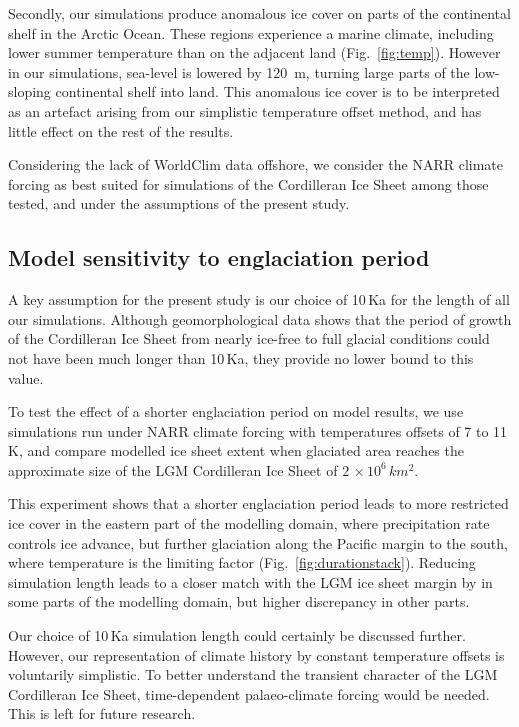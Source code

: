 Secondly, our simulations produce anomalous ice cover on parts of the continental shelf in the Arctic Ocean. These regions experience a marine climate, including lower summer temperature than on the adjacent land (Fig.~\ref{fig:temp}). However in our simulations, sea-level is lowered by 120~m, turning large parts of the low-sloping continental shelf into land. This anomalous ice cover is to be interpreted as an artefact arising from our simplistic temperature offset method, and has little effect on the rest of the results.

Considering the lack of WorldClim data offshore, we consider the NARR climate forcing as best suited for simulations of the Cordilleran Ice Sheet among those tested, and under the assumptions of the present study.

\subsection{Model sensitivity to englaciation period}

A key assumption for the present study is our choice of 10\,Ka for the length of all our simulations. Although geomorphological data shows that the period of growth of the Cordilleran Ice Sheet from nearly ice-free to full glacial conditions could not have been much longer than 10\,Ka, they provide no lower bound to this value.

To test the effect of a shorter englaciation period on model results, we use simulations run under NARR climate forcing with temperatures offsets of 7 to 11\,K, and compare modelled ice sheet extent when glaciated area reaches the approximate size of the LGM Cordilleran Ice Sheet of $2\,\times10^6\,\unit{km^2}$.

This experiment shows that a shorter englaciation period leads to more restricted ice cover in the eastern part of the modelling domain, where precipitation rate controls ice advance, but further glaciation along the Pacific margin to the south, where temperature is the limiting factor (Fig.~\ref{fig:durationstack}). Reducing simulation length leads to a closer match with the LGM ice sheet margin by \citet{dyke-2004} in some parts of the modelling domain, but higher discrepancy in other parts.

Our choice of 10\,Ka simulation length could certainly be discussed further. However, our representation of climate history by constant temperature offsets is voluntarily simplistic. To better understand the transient character of the LGM Cordilleran Ice Sheet, time-dependent palaeo-climate forcing would be needed. This is left for future research.

